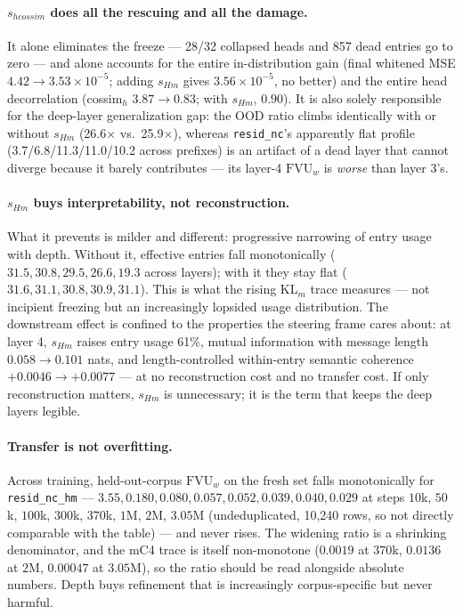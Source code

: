 \documentclass[11pt]{article}
\newcommand{\fvu}{\mathrm{FVU}_w}
\begin{document}
\paragraph{$s_{hcossim}$ does all the rescuing and all the damage.}
It alone eliminates the freeze --- 28/32 collapsed heads and 857 dead
entries go to zero --- and alone accounts for the entire in-distribution
gain (final whitened MSE $4.42 \to 3.53\times10^{-5}$; adding $s_{Hm}$
gives $3.56\times10^{-5}$, no better) and the entire head decorrelation
(cossim$_h$ $3.87 \to 0.83$; with $s_{Hm}$, $0.90$). It is also solely
responsible for the deep-layer generalization gap: the OOD ratio climbs
identically with or without $s_{Hm}$ (26.6$\times$ vs.\ 25.9$\times$),
whereas \texttt{resid\_nc}'s apparently flat profile
(3.7/6.8/11.3/11.0/10.2 across prefixes) is an artifact of a dead layer
that cannot diverge because it barely contributes --- its layer-4 $\fvu$
is \emph{worse} than layer 3's.

\paragraph{$s_{Hm}$ buys interpretability, not reconstruction.}
What it prevents is milder and different: progressive narrowing of entry
usage with depth. Without it, effective entries fall monotonically
($31.5, 30.8, 29.5, 26.6, 19.3$ across layers); with it they stay flat
($31.6, 31.1, 30.8, 30.9, 31.1$). This is what the rising $\mathrm{KL}_m$
trace measures --- not incipient freezing but an increasingly lopsided
usage distribution. The downstream effect is confined to the properties
the steering frame cares about: at layer 4, $s_{Hm}$ raises entry usage
61\%, mutual information with message length $0.058 \to 0.101$ nats, and
length-controlled within-entry semantic coherence $+0.0046 \to +0.0077$
--- at no reconstruction cost and no transfer cost. If only reconstruction
matters, $s_{Hm}$ is unnecessary; it is the term that keeps the deep
layers legible.

\paragraph{Transfer is not overfitting.} Across training,
held-out-corpus $\fvu$ on the fresh set falls monotonically for
\texttt{resid\_nc\_hm} --- $3.55, 0.180, 0.080, 0.057, 0.052, 0.039,
0.040, 0.029$ at steps $10$k, $50$k, $100$k, $300$k, $370$k, $1$M, $2$M,
$3.05$M (undeduplicated, 10{,}240 rows, so not directly comparable with
the table) --- and never rises. The widening ratio is
a shrinking denominator, and the mC4 trace is itself non-monotone
($0.0019$ at $370$k, $0.0136$ at $2$M, $0.00047$ at $3.05$M), so the ratio
should be read alongside absolute numbers. Depth buys refinement that is
increasingly corpus-specific but never harmful.
\end{document}
